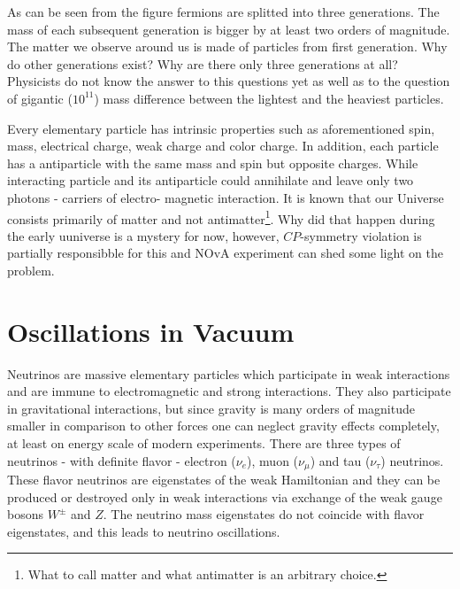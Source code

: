 As can be seen from the figure  fermions are splitted into three generations. The mass of each 
subsequent generation is bigger by at least two orders of magnitude. The matter we observe 
around us is made of particles from first generation. Why do other generations exist? Why are
there only three generations at all? Physicists do not know the answer to this questions yet 
as well as to the question of gigantic ($10^{11}$) mass difference between the lightest and
the heaviest particles. 

Every elementary particle has intrinsic properties such as aforementioned spin, mass, 
electrical charge, weak charge and color charge. In addition, each particle has a 
antiparticle with the same mass and spin but opposite charges. While interacting particle 
and its antiparticle could annihilate and leave only two photons - carriers of electro-
magnetic interaction. It is known that our Universe consists primarily of matter and not 
antimatter\footnote{What to call matter and what antimatter is an arbitrary choice.}. Why
did that happen during the early uuniverse is a mystery for now, however, $CP$-symmetry
violation is partially responsibble for this and NOvA experiment can shed some light on
the problem.

 


\section{Oscillations in Vacuum}
Neutrinos are massive elementary particles which participate in weak interactions 
and are immune to electromagnetic and strong interactions. They also participate 
in gravitational interactions, but since gravity is many orders of magnitude smaller 
in comparison to other forces one can neglect gravity effects completely, at least 
on energy scale of modern experiments. There are three types of neutrinos - 
with definite flavor - electron ($\nu_e$), muon ($\nu_\mu$) and tau ($\nu_\tau$) 
neutrinos. These flavor neutrinos are eigenstates of the weak Hamiltonian and they 
can be produced or destroyed only in weak interactions via exchange of the weak 
gauge bosons $W^\pm$ and $Z$. The neutrino mass eigenstates do not coincide with 
flavor eigenstates, and this leads to neutrino oscillations.

